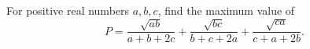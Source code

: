 For positive real numbers $a,b,c$, find the maximum value of
\[
P=\dfrac{\sqrt{ab}}{a+b+2c}+\dfrac{\sqrt{bc}}{b+c+2a}+\dfrac{\sqrt{ca}}{c+a+2b}.
\]
